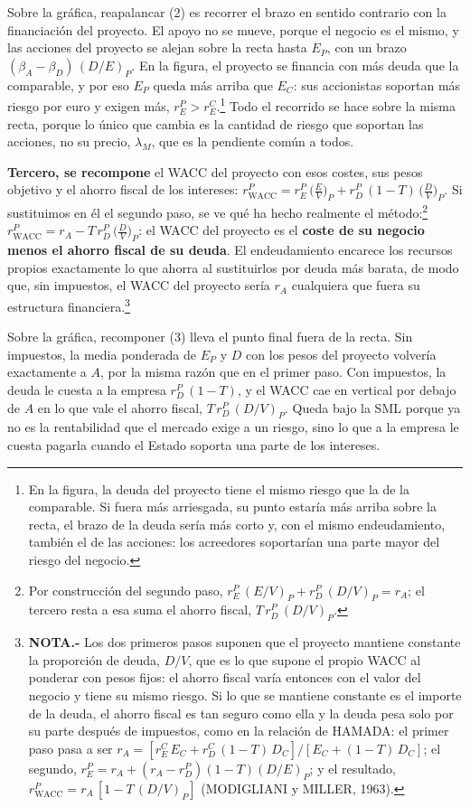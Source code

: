 \documentclass[10pt,a4paper]{article}
\begin{document}
Sobre la gráfica, reapalancar (2) es recorrer el brazo en sentido contrario con la financiación del proyecto. El apoyo no se mueve, porque el negocio es el mismo, y las acciones del proyecto se alejan sobre la recta hasta $E_P$, con un brazo $(\beta_A-\beta_D)\,(D/E)_P$. En la figura, el proyecto se financia con más deuda que la comparable, y por eso $E_P$ queda más arriba que $E_C$: sus accionistas soportan más riesgo por euro y exigen más, $r_E^P>r_E^C$.\footnote{%
  En la figura, la deuda del proyecto tiene el mismo riesgo que la de la comparable. Si fuera más arriesgada, su punto estaría más arriba sobre la recta, el brazo de la deuda sería más corto y, con el mismo endeudamiento, también el de las acciones: los acreedores soportarían una parte mayor del riesgo del negocio.
} Todo el recorrido se hace sobre la misma recta, porque lo único que cambia es la cantidad de riesgo que soportan las acciones, no su precio, $\lambda_M$, que es la pendiente común a todos.

\textbf{Tercero, se recompone} el WACC del proyecto con esos costes, sus pesos objetivo y el ahorro fiscal de los intereses: $r_{\text{WACC}}^P=r_E^P\,\Big(\frac{E}{V}\Big)_P+r_D^P\,(1-T)\,\Big(\frac{D}{V}\Big)_P$. Si sustituimos en él el segundo paso, se ve qué ha hecho realmente el método:\footnote{%
    Por construcción del segundo paso, $r_E^P\,(E/V)_P+r_D^P\,(D/V)_P=r_A$; el tercero resta a esa suma el ahorro fiscal, $T\,r_D^P\,(D/V)_P$.
} $r_{\text{WACC}}^P=r_A-T\,r_D^P\,\Big(\frac{D}{V}\Big)_P$: el WACC del proyecto es el \textbf{coste de su negocio menos el ahorro fiscal de su deuda}. El endeudamiento encarece los recursos propios exactamente lo que ahorra al sustituirlos por deuda más barata, de modo que, sin impuestos, el WACC del proyecto sería $r_A$ cualquiera que fuera su estructura financiera.\footnote{%
    \textbf{NOTA.-} Los dos primeros pasos suponen que el proyecto mantiene constante la proporción de deuda, $D/V$, que es lo que supone el propio WACC al ponderar con pesos fijos: el ahorro fiscal varía entonces con el valor del negocio y tiene su mismo riesgo. Si lo que se mantiene constante es el importe de la deuda, el ahorro fiscal es tan seguro como ella y la deuda pesa solo por su parte después de impuestos, como en la relación de HAMADA: el primer paso pasa a ser $r_A=[r_E^C\,E_C+r_D^C\,(1-T)\,D_C]/[E_C+(1-T)\,D_C]$; el segundo, $r_E^P=r_A+(r_A-r_D^P)(1-T)(D/E)_P$; y el resultado, $r_{\text{WACC}}^P=r_A\,[1-T\,(D/V)_P]$ (MODIGLIANI y MILLER, 1963).
}

Sobre la gráfica, recomponer (3) lleva el punto final fuera de la recta. Sin impuestos, la media ponderada de $E_P$ y $D$ con los pesos del proyecto volvería exactamente a $A$, por la misma razón que en el primer paso. Con impuestos, la deuda le cuesta a la empresa $r_D^P\,(1-T)$, y el WACC cae en vertical por debajo de $A$ en lo que vale el ahorro fiscal, $T\,r_D^P\,(D/V)_P$. Queda bajo la SML porque ya no es la rentabilidad que el mercado exige a un riesgo, sino lo que a la empresa le cuesta pagarla cuando el Estado soporta una parte de los intereses.
\end{document}
